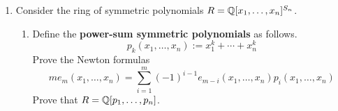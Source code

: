 \documentclass[../psets.tex]{subfiles}
\begin{document}
\begin{enumerate}
\begin{enumerate}
\begin{proof}
            We have to deduce this from the supposition??
        \end{proof}
        \item Prove that $\rho(x)=-\id$.
        \begin{proof}
            We know that $\rho(x)^2=\id$. We also know that $\rho(x)$ is diagonalizable with roots of unity for eigenvalues. Since $\rho$ is faithful, $\rho(x)\neq\id$. What if only one of the diagonal values in the matrix was $-1$??
        \end{proof}
        \item Prove that $\rho([g,x])=\id$ for any $g$ and deduce the theorem.
        \begin{proof}
            Let $g\in G$ be arbitrary. Then
            \begin{align*}
                \rho([g,x]) &= \rho(g^{-1}x^{-1}gx)\\
                &= \rho(g^{-1})\circ\rho(x^{-1})\circ\rho(g)\circ\rho(x)\\
                &= \rho(g)^{-1}\circ\rho(x)\circ\rho(g)\circ\rho(x)\\
                &= \rho(g)^{-1}\circ(-\id)\circ\rho(g)\circ(-\id)\\
                &= \rho(g)^{-1}\circ\rho(g)\circ(-\id)\circ(-\id)\\
                &= \id
            \end{align*}
            Thus, $\rho([g,x])=\rho(e)$. So since $\rho$ is faithful once again, $[g,x]=e$. Since $Z(G)\triangleleft G$ and $G$ is nonabelian, $Z(G)=\{e\}$. However, we have just shown that $x(\neq e)\in Z(G)$, a contradiction.
        \end{proof}
    \end{enumerate}
    \item Consider the ring of symmetric polynomials $R=\mathbb{Q}[x_1,\dots,x_n]^{S_n}$.
    \begin{enumerate}
        \item Define the \textbf{power-sum symmetric polynomials} as follows.
        \begin{equation*}
            p_k(x_1,\dots,x_n) := x_1^k+\cdots+x_n^k
        \end{equation*}
        Prove the Newton formulas
        \begin{equation*}
            me_m(x_1,\dots,x_n) = \sum_{i=1}^m(-1)^{i-1}e_{m-i}(x_1,\dots,x_n)p_i(x_1,\dots,x_n)
        \end{equation*}
        Prove that $R=\mathbb{Q}[p_1,\dots,p_n]$.

\end{enumerate}
\end{enumerate}
\end{document}
